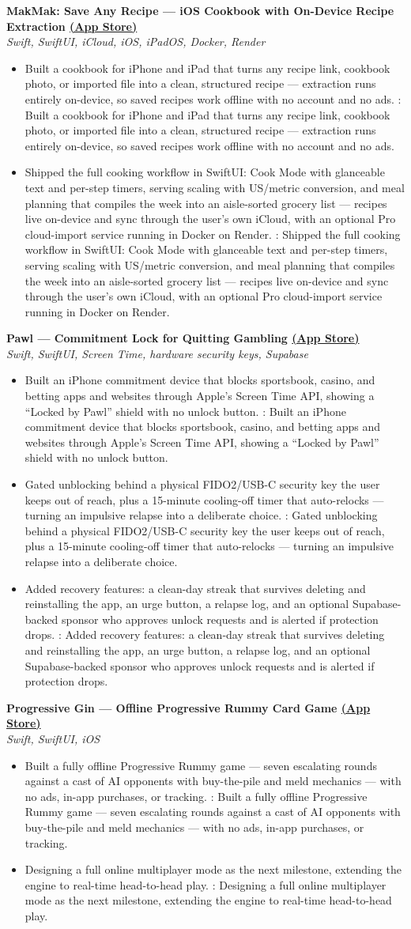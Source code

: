 \documentclass[letterpaper,11pt]{article}
\newcommand{\resumeItem}[2]{
  \item\small{
    \if\relax\detokenize{#1}\relax
      #2 \vspace{-2.5pt}
    \else
      \textbf{#1}{: } #2 \vspace{-2.5pt}
    \fi
  }
}
\newcommand{\resumeProjectHeading}[2]{
  \vspace{-1pt}\item
    \textbf{#1}\\
    {\small\textit{#2}}\vspace{-5pt}
}
\newcommand{\resumeItemListStart}{\begin{itemize}}
\newcommand{\resumeItemListEnd}{\end{itemize}\vspace{-6pt}}
\begin{document}
\resumeProjectHeading
  {MakMak: Save Any Recipe --- iOS Cookbook with On-Device Recipe Extraction \href{https://apps.apple.com/app/makmak-save-any-recipe/id6782430587}{\small(App Store)}}{Swift, SwiftUI, iCloud, iOS, iPadOS, Docker, Render}
  \resumeItemListStart
    \resumeItem{}{Built a cookbook for iPhone and iPad that turns any recipe link, cookbook photo, or imported file into a clean, structured recipe --- extraction runs entirely on-device, so saved recipes work offline with no account and no ads.}
    \resumeItem{}{Shipped the full cooking workflow in SwiftUI: Cook Mode with glanceable text and per-step timers, serving scaling with US/metric conversion, and meal planning that compiles the week into an aisle-sorted grocery list --- recipes live on-device and sync through the user's own iCloud, with an optional Pro cloud-import service running in Docker on Render.}
  \resumeItemListEnd

\resumeProjectHeading
  {Pawl --- Commitment Lock for Quitting Gambling \href{https://apps.apple.com/us/app/pawl-commitment-lock/id6783119309}{\small(App Store)}}{Swift, SwiftUI, Screen Time, hardware security keys, Supabase}
  \resumeItemListStart
    \resumeItem{}{Built an iPhone commitment device that blocks sportsbook, casino, and betting apps and websites through Apple's Screen Time API, showing a ``Locked by Pawl'' shield with no unlock button.}
    \resumeItem{}{Gated unblocking behind a physical FIDO2/USB-C security key the user keeps out of reach, plus a 15-minute cooling-off timer that auto-relocks --- turning an impulsive relapse into a deliberate choice.}
    \resumeItem{}{Added recovery features: a clean-day streak that survives deleting and reinstalling the app, an urge button, a relapse log, and an optional Supabase-backed sponsor who approves unlock requests and is alerted if protection drops.}
  \resumeItemListEnd

\resumeProjectHeading
  {Progressive Gin --- Offline Progressive Rummy Card Game \href{https://apps.apple.com/us/app/progressive-gin/id6779775743}{\small(App Store)}}{Swift, SwiftUI, iOS}
  \resumeItemListStart
    \resumeItem{}{Built a fully offline Progressive Rummy game --- seven escalating rounds against a cast of AI opponents with buy-the-pile and meld mechanics --- with no ads, in-app purchases, or tracking.}
    \resumeItem{}{Designing a full online multiplayer mode as the next milestone, extending the engine to real-time head-to-head play.}
  \resumeItemListEnd
\end{document}
